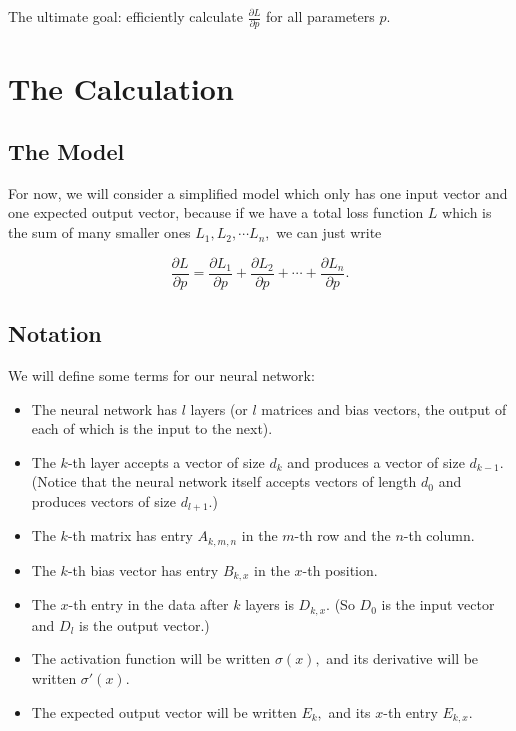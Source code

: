 \documentclass{article}
\begin{document}
The ultimate goal: efficiently calculate $\frac{\partial L}{\partial p}$ for all parameters $p.$

\section{The Calculation}

\subsection{The Model}

For now, we will consider a simplified model which only has one input vector and one expected output vector, because if we have a total loss function $L$ which is the sum of many smaller ones $L_1, L_2, \cdots L_n,$ we can just write

\begin{equation}
\label{totalloss}
\frac{\partial L}{\partial p} = \frac{\partial L_1}{\partial p} + \frac{\partial L_2}{\partial p} + \cdots + \frac{\partial L_n}{\partial p}.
\end{equation}

\subsection{Notation}

We will define some terms for our neural network:

\begin{itemize}

\item The neural network has $l$ layers (or $l$ matrices and bias vectors, the output of each of which is the input to the next).

\item The $k$-th layer accepts a vector of size $d_k$ and produces a vector of size $d_{k-1}.$ (Notice that the neural network itself accepts vectors of length $d_0$ and produces vectors of size $d_{l+1}.$)

\item The $k$-th matrix has entry $A_{k,m,n}$ in the $m$-th row and the $n$-th column.

\item The $k$-th bias vector has entry $B_{k,x}$ in the $x$-th position.

\item The $x$-th entry in the data after $k$ layers is $D_{k,x}.$ (So $D_0$ is the input vector and $D_l$ is the output vector.)

\item The activation function will be written $\sigma(x),$ and its derivative will be written $\sigma'(x).$

\item The expected output vector will be written $E_k,$ and its $x$-th entry $E_{k,x}.$

\end{itemize}
\end{document}
